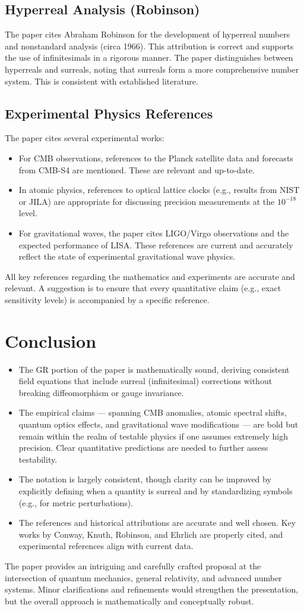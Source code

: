 \documentclass{article}
\begin{document}
\subsection*{Hyperreal Analysis (Robinson)}
The paper cites Abraham Robinson for the development of hyperreal numbers and nonstandard analysis (circa 1966). This attribution is correct and supports the use of infinitesimals in a rigorous manner. The paper distinguishes between hyperreals and surreals, noting that surreals form a more comprehensive number system. This is consistent with established literature.

\subsection*{Experimental Physics References}
The paper cites several experimental works:
\begin{itemize}[noitemsep]
    \item For CMB observations, references to the Planck satellite data and forecasts from CMB-S4 are mentioned. These are relevant and up-to-date.
    \item In atomic physics, references to optical lattice clocks (e.g., results from NIST or JILA) are appropriate for discussing precision measurements at the $10^{-18}$ level.
    \item For gravitational waves, the paper cites LIGO/Virgo observations and the expected performance of LISA. These references are current and accurately reflect the state of experimental gravitational wave physics.
\end{itemize}
All key references regarding the mathematics and experiments are accurate and relevant. A suggestion is to ensure that every quantitative claim (e.g., exact sensitivity levels) is accompanied by a specific reference.

\section*{Conclusion}
\begin{itemize}
    \item The GR portion of the paper is mathematically sound, deriving consistent field equations that include surreal (infinitesimal) corrections without breaking diffeomorphism or gauge invariance.
    \item The empirical claims --- spanning CMB anomalies, atomic spectral shifts, quantum optics effects, and gravitational wave modifications --- are bold but remain within the realm of testable physics if one assumes extremely high precision. Clear quantitative predictions are needed to further assess testability.
    \item The notation is largely consistent, though clarity can be improved by explicitly defining when a quantity is surreal and by standardizing symbols (e.g., for metric perturbations).
    \item The references and historical attributions are accurate and well chosen. Key works by Conway, Knuth, Robinson, and Ehrlich are properly cited, and experimental references align with current data.
\end{itemize}

The paper provides an intriguing and carefully crafted proposal at the intersection of quantum mechanics, general relativity, and advanced number systems. Minor clarifications and refinements would strengthen the presentation, but the overall approach is mathematically and conceptually robust.
\end{document}
